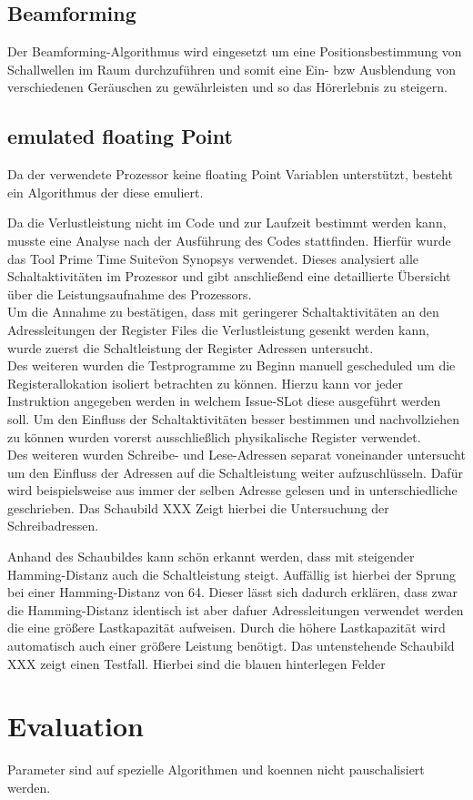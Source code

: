 \subsection{Beamforming}
Der Beamforming-Algorithmus wird eingesetzt um eine Positionsbestimmung von Schallwellen im Raum durchzuführen und somit eine Ein- bzw Ausblendung von verschiedenen Geräuschen zu gewährleisten und so das Hörerlebnis zu steigern. 

\subsection{emulated floating Point}
Da der verwendete Prozessor keine floating Point Variablen unterstützt, besteht ein Algorithmus der diese emuliert. 

Da die Verlustleistung nicht im Code und zur Laufzeit bestimmt werden kann, musste eine Analyse nach der Ausführung des Codes stattfinden. Hierfür wurde das Tool \"Prime Time Suite\" von Synopsys verwendet. Dieses analysiert alle Schaltaktivitäten im Prozessor und gibt anschließend eine detaillierte Übersicht über die Leistungsaufnahme des Prozessors.\\
Um die Annahme zu bestätigen, dass mit geringerer Schaltaktivitäten an den Adressleitungen der Register Files die Verlustleistung gesenkt werden kann, wurde zuerst die Schaltleistung der Register Adressen untersucht.\\
Des weiteren wurden die Testprogramme zu Beginn manuell gescheduled um die Registerallokation isoliert betrachten zu können. Hierzu kann vor jeder Instruktion angegeben werden in welchem Issue-SLot diese ausgeführt werden soll. Um den Einfluss der Schaltaktivitäten besser bestimmen und nachvollziehen zu können wurden vorerst ausschließlich physikalische Register verwendet. \\
Des weiteren wurden Schreibe- und Lese-Adressen separat voneinander untersucht um den Einfluss der Adressen auf die Schaltleistung weiter aufzuschlüsseln. Dafür wird beispielsweise aus immer der selben Adresse gelesen und in unterschiedliche geschrieben. Das Schaubild XXX Zeigt hierbei die Untersuchung der Schreibadressen.

%	
Anhand des Schaubildes kann schön erkannt werden, dass mit steigender Hamming-Distanz auch die Schaltleistung steigt. Auffällig ist hierbei der Sprung bei einer Hamming-Distanz von 64. Dieser lässt sich dadurch erklären, dass zwar die Hamming-Distanz identisch ist aber dafuer Adressleitungen verwendet werden die eine größere Lastkapazität aufweisen. Durch die höhere Lastkapazität wird automatisch auch einer größere Leistung benötigt.
Das untenstehende Schaubild XXX zeigt einen Testfall. Hierbei sind die blauen hinterlegen Felder 

\section{Evaluation}
\label{sec:evalutation_verification}

Parameter sind auf spezielle Algorithmen und koennen nicht pauschalisiert werden.